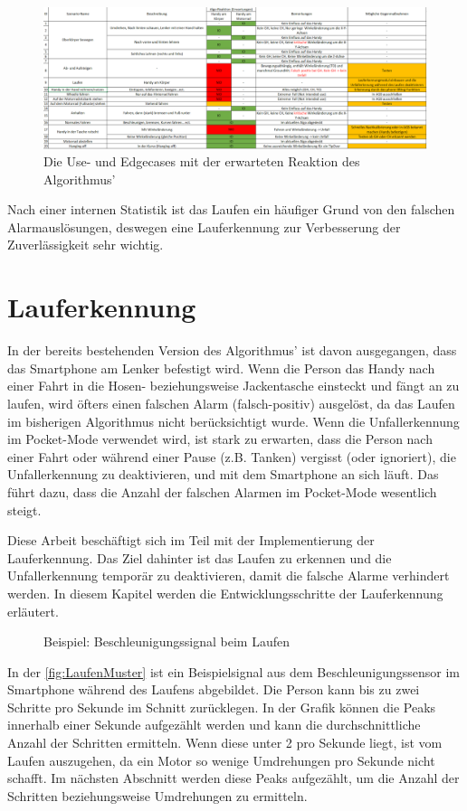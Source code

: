 \begin{figure}[H]%
	\centering
	\includegraphics[width=\linewidth]{Bilder/EdgeCasesExcel.png} %
	\caption{Die Use- und Edgecases mit der erwarteten Reaktion des Algorithmus'}
	\label{fig:EdgeCasesExcel}
\end{figure}

Nach einer internen Statistik ist das Laufen ein häufiger Grund von den falschen Alarmauslösungen, deswegen eine Lauferkennung zur Verbesserung der Zuverlässigkeit sehr wichtig.

\section{Lauferkennung} \label{sec:Lauferkennung}
In der bereits bestehenden Version des Algorithmus' ist davon ausgegangen, dass das Smartphone am Lenker befestigt wird. Wenn die Person das Handy nach einer Fahrt in die Hosen- beziehungsweise Jackentasche einsteckt und fängt an zu laufen, wird öfters einen falschen Alarm (falsch-positiv) ausgelöst, da das Laufen im bisherigen Algorithmus nicht berücksichtigt wurde.
Wenn die Unfallerkennung im Pocket-Mode verwendet wird, ist stark zu erwarten, dass die Person nach einer Fahrt oder während einer Pause (z.B. Tanken) vergisst (oder ignoriert), die Unfallerkennung zu deaktivieren, und mit dem Smartphone an sich läuft. Das führt dazu, dass die Anzahl der falschen Alarmen im Pocket-Mode wesentlich steigt.

Diese Arbeit beschäftigt sich im Teil mit der Implementierung der Lauferkennung. Das Ziel dahinter ist das Laufen zu erkennen und die Unfallerkennung temporär zu deaktivieren, damit die falsche Alarme verhindert werden.
In diesem Kapitel werden die Entwicklungsschritte der Lauferkennung erläutert.

%

\begin{figure}[H]
	\centering
	\caption{Beispiel: Beschleunigungssignal beim Laufen}
	\label{fig:LaufenMuster}
\end{figure}
In der \autoref{fig:LaufenMuster} ist ein Beispielsignal aus dem Beschleunigungssensor im Smartphone während des Laufens abgebildet. Die Person kann bis zu zwei Schritte pro Sekunde im Schnitt zurücklegen. In der Grafik können die Peaks innerhalb einer Sekunde aufgezählt werden und kann die durchschnittliche Anzahl der Schritten ermitteln. Wenn diese unter 2 pro Sekunde liegt, ist vom Laufen auszugehen, da ein Motor so wenige Umdrehungen pro Sekunde nicht schafft. Im nächsten Abschnitt werden diese Peaks aufgezählt, um die Anzahl der Schritten beziehungsweise Umdrehungen zu ermitteln.
%
